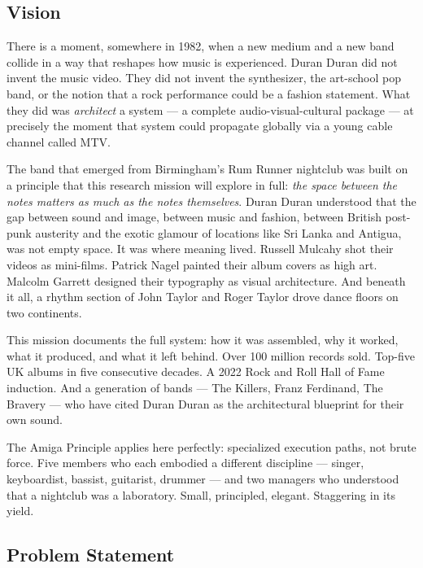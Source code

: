 \documentclass[11pt,letterpaper]{article}
\begin{document}
\subsection{Vision}

There is a moment, somewhere in 1982, when a new medium and a new band collide in a way that reshapes how music is experienced. Duran Duran did not invent the music video. They did not invent the synthesizer, the art-school pop band, or the notion that a rock performance could be a fashion statement. What they did was \textit{architect} a system --- a complete audio-visual-cultural package --- at precisely the moment that system could propagate globally via a young cable channel called MTV.

The band that emerged from Birmingham's Rum Runner nightclub was built on a principle that this research mission will explore in full: \textit{the space between the notes matters as much as the notes themselves}. Duran Duran understood that the gap between sound and image, between music and fashion, between British post-punk austerity and the exotic glamour of locations like Sri Lanka and Antigua, was not empty space. It was where meaning lived. Russell Mulcahy shot their videos as mini-films. Patrick Nagel painted their album covers as high art. Malcolm Garrett designed their typography as visual architecture. And beneath it all, a rhythm section of John Taylor and Roger Taylor drove dance floors on two continents.

This mission documents the full system: how it was assembled, why it worked, what it produced, and what it left behind. Over 100 million records sold. Top-five UK albums in five consecutive decades. A 2022 Rock and Roll Hall of Fame induction. And a generation of bands --- The Killers, Franz Ferdinand, The Bravery --- who have cited Duran Duran as the architectural blueprint for their own sound.

The Amiga Principle applies here perfectly: specialized execution paths, not brute force. Five members who each embodied a different discipline --- singer, keyboardist, bassist, guitarist, drummer --- and two managers who understood that a nightclub was a laboratory. Small, principled, elegant. Staggering in its yield.

\subsection{Problem Statement}
\end{document}

